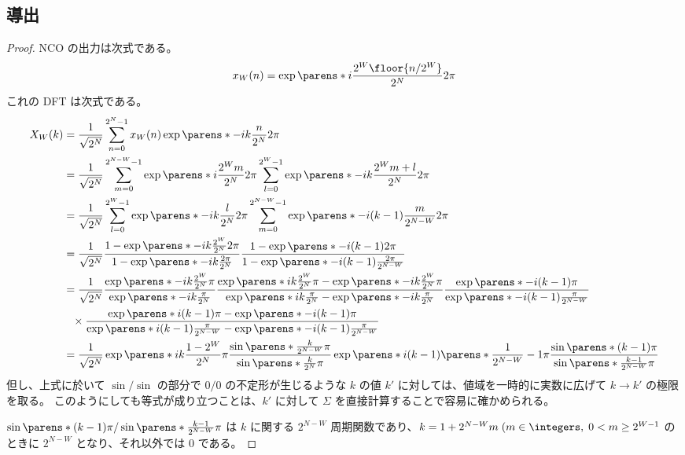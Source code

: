         \subsection{導出}
            \begin{proof}
                \quad\par
                NCO の出力は次式である。
                \[ x_W(n) = \exp\parens*{i\frac{2^W\floor{n/2^W}}{2^N}2\pi} \]
                これの DFT は次式である。
                \begin{align*}
                    X_W(k) &= \frac{1}{\sqrt{2^N}} \sum_{n=0}^{2^N-1} x_W(n)\exp\parens*{-ik\frac{n}{2^N}2\pi} \\
                    &= \frac{1}{\sqrt{2^N}} \sum_{m=0}^{2^{N-W}-1} \exp\parens*{i\frac{2^W m}{2^N}2\pi} \sum_{l=0}^{2^W-1} \exp\parens*{-ik\frac{2^W m + l}{2^N}2\pi} \\
                    &= \frac{1}{\sqrt{2^N}} \sum_{l=0}^{2^W-1} \exp\parens*{-ik\frac{l}{2^N}2\pi} \sum_{m=0}^{2^{N-W}-1} \exp\parens*{-i(k-1)\frac{m}{2^{N-W}}2\pi} \\
                    &= \frac{1}{\sqrt{2^N}} \frac{1-\exp\parens*{-ik\frac{2^W}{2^N}2\pi}}{1-\exp\parens*{-ik\frac{2\pi}{2^N}}}\frac{1-\exp\parens*{-i(k-1)2\pi}}{1-\exp\parens*{-i(k-1)\frac{2\pi}{2^{N-W}}}} \\
                    &= \frac{1}{\sqrt{2^N}}\frac{\exp\parens*{-ik\frac{2^W}{2^N}\pi}}{\exp\parens*{-ik\frac{\pi}{2^N}}}\frac{\exp\parens*{ik\frac{2^W}{2^N}\pi} - \exp\parens*{-ik\frac{2^W}{2^N}\pi}}{\exp\parens*{ik\frac{\pi}{2^N}} - \exp\parens*{-ik\frac{\pi}{2^N}}}\frac{\exp\parens*{-i(k-1)\pi}}{\exp\parens*{-i(k-1)\frac{\pi}{2^{N-W}}}} \\
                    &\phantom{=}\times\frac{\exp\parens*{i(k-1)\pi} - \exp\parens*{-i(k-1)\pi}}{\exp\parens*{i(k-1)\frac{\pi}{2^{N-W}}} - \exp\parens*{-i(k-1)\frac{\pi}{2^{N-W}}}} \\
                    &= \frac{1}{\sqrt{2^N}} \exp\parens*{ik\frac{1-2^W}{2^N}\pi}\frac{\sin\parens*{\frac{k}{2^{N-W}}\pi}}{\sin\parens*{\frac{k}{2^N}\pi}}\exp\parens*{i(k-1)\parens*{\frac{1}{2^{N-W}}-1}\pi}\frac{\sin\parens*{(k-1)\pi}}{\sin\parens*{\frac{k-1}{2^{N-W}}\pi}} %
                \end{align*}
                但し、上式に於いて $\sin/\sin$ の部分で $0/0$ の不定形が生じるような $k$ の値 $k'$ に対しては、値域を一時的に実数に広げて $k\to k'$ の極限を取る。
                このようにしても等式が成り立つことは、$k'$ に対して $\Sigma$ を直接計算することで容易に確かめられる。
                \par
                $\sin\parens*{(k-1)\pi}/\sin\parens*{\frac{k-1}{2^{N-W}}\pi}$ は $k$ に関する $2^{N-W}$ 周期関数であり、$k = 1 + 2^{N-W}m\;(m\in\integers,\;0<m\geq 2^{W-1}$ のときに $2^{N-W}$ となり、それ以外では 0 である。
            \end{proof}

